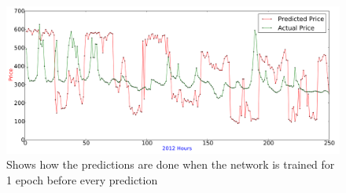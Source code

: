 \begin{figure}[H]
\centering
\includegraphics[width=\linewidth]{billeder/PriceExperimentalAnalysis/1EpochTraining.png}
\caption{Shows how the predictions are done when the network is trained for 1 epoch before every prediction}
\label{fig:1epoch}
\end{figure}


